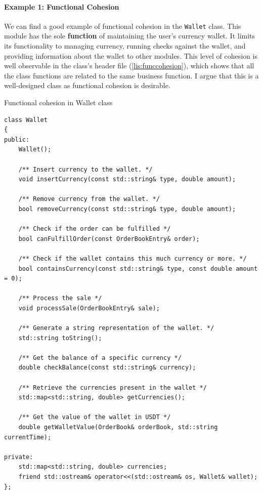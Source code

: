 \paragraph{Example 1: Functional Cohesion} %
\label{par:example_1_functional_cohesion}
We can find a good example of functional cohesion in the \texttt{Wallet} class. This module has the sole \textbf{function} of maintaining the user's currency wallet. It limits its functionality to managing currency, running checks against the wallet, and providing information about the wallet to other modules. This level of cohesion is well observable in the class's header file (\autoref{lis:funccohesion}), which shows that all the class functions are related to the same business function. I argue that this is a well-designed class as functional cohesion is desirable.

\begin{listing}[h]
	\caption{Functional cohesion in Wallet class}
	\label{lis:funccohesion}
	\begin{verbatim}
class Wallet
{
public:
	Wallet();

	/** Insert currency to the wallet. */
	void insertCurrency(const std::string& type, double amount);

	/** Remove currency from the wallet. */
	bool removeCurrency(const std::string& type, double amount);

	/** Check if the order can be fulfilled */
	bool canFulfillOrder(const OrderBookEntry& order);

	/** Check if the wallet contains this much currency or more. */
	bool containsCurrency(const std::string& type, const double amount = 0);

	/** Process the sale */
	void processSale(OrderBookEntry& sale);

	/** Generate a string representation of the wallet. */
	std::string toString();

	/** Get the balance of a specific currency */
	double checkBalance(const std::string& currency);

	/** Retrieve the currencies present in the wallet */
	std::map<std::string, double> getCurrencies();

	/** Get the value of the wallet in USDT */
	double getWalletValue(OrderBook& orderBook, std::string currentTime);

private:
	std::map<std::string, double> currencies;
	friend std::ostream& operator<<(std::ostream& os, Wallet& wallet);
};
	\end{verbatim}
\end{listing}


